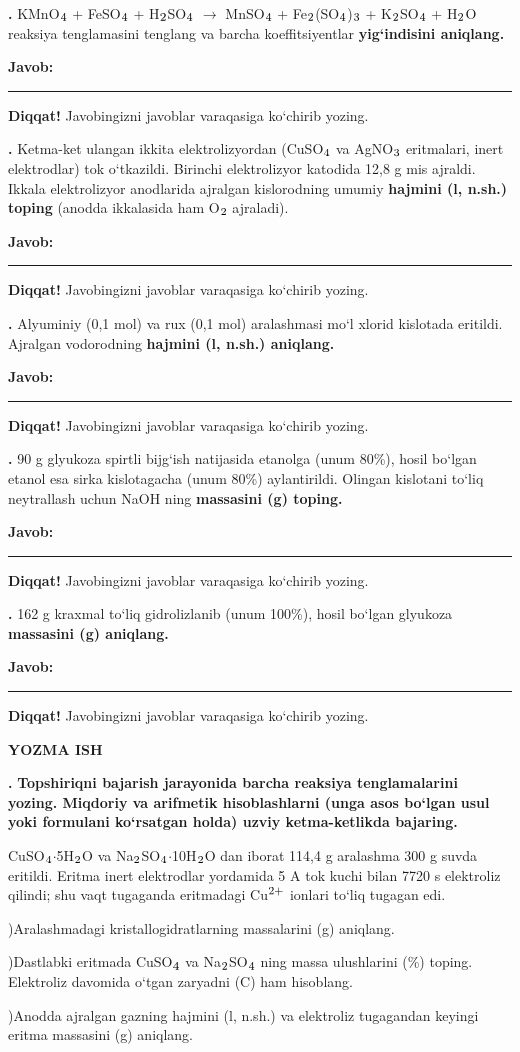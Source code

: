 \documentclass[11pt,a4paper]{article}
\renewcommand{\textsubscript}[1]{\ensuremath{_{\text{\fontsize{8}{8}\selectfont #1}}}}
\renewcommand{\textsuperscript}[1]{\ensuremath{^{\text{\fontsize{8}{8}\selectfont #1}}}}
\newcommand{\qn}[1]{\textbf{\fontsize{11.5}{13}\selectfont #1}}
\newcommand{\qsep}{\par\vspace{1pt}\noindent\rule{0pt}{0.4pt}\par\vspace{5pt}}
\newcommand{\javob}{\par\smallskip\noindent\textbf{Javob:} \rule[-2pt]{7.5cm}{0.4pt}\par\smallskip\noindent\textbf{Diqqat!} Javobingizni javoblar varaqasiga ko`chirib yozing.\par\medskip}
\begin{document}
\noindent\qn{36.} KMnO\textsubscript{4} + FeSO\textsubscript{4} + H\textsubscript{2}SO\textsubscript{4} $\to$ MnSO\textsubscript{4} + Fe\textsubscript{2}(SO\textsubscript{4})\textsubscript{3} + K\textsubscript{2}SO\textsubscript{4} + H\textsubscript{2}O reaksiya tenglamasini tenglang va barcha koeffitsiyentlar \textbf{yig`indisini aniqlang.}
\javob\qsep
\noindent\qn{37.} Ketma-ket ulangan ikkita elektrolizyordan (CuSO\textsubscript{4} va AgNO\textsubscript{3} eritmalari, inert elektrodlar) tok o`tkazildi. Birinchi elektrolizyor katodida 12,8 g mis ajraldi. Ikkala elektrolizyor anodlarida ajralgan kislorodning umumiy \textbf{hajmini (l, n.sh.) toping} (anodda ikkalasida ham O\textsubscript{2} ajraladi).
\javob\qsep
\noindent\qn{38.} Alyuminiy (0,1 mol) va rux (0,1 mol) aralashmasi mo`l xlorid kislotada eritildi. Ajralgan vodorodning \textbf{hajmini (l, n.sh.) aniqlang.}
\javob\qsep
\noindent\qn{39.} 90 g glyukoza spirtli bijg`ish natijasida etanolga (unum 80\%), hosil bo`lgan etanol esa sirka kislotagacha (unum 80\%) aylantirildi. Olingan kislotani to`liq neytrallash uchun NaOH ning \textbf{massasini (g) toping.}
\javob\qsep
\noindent\qn{40.} 162 g kraxmal to`liq gidrolizlanib (unum 100\%), hosil bo`lgan glyukoza \textbf{massasini (g) aniqlang.}
\javob\qsep
\par\bigskip\begin{center}\textbf{\fontsize{13}{15}\selectfont YOZMA ISH}\end{center}
\noindent\qn{41.} \textbf{Topshiriqni bajarish jarayonida barcha reaksiya tenglamalarini yozing. Miqdoriy va arifmetik hisoblashlarni (unga asos bo`lgan usul yoki formulani ko`rsatgan holda) uzviy ketma-ketlikda bajaring.}\par\smallskip
CuSO\textsubscript{4}$\cdot$5H\textsubscript{2}O va Na\textsubscript{2}SO\textsubscript{4}$\cdot$10H\textsubscript{2}O dan iborat 114,4 g aralashma 300 g suvda eritildi. Eritma inert elektrodlar yordamida 5 A tok kuchi bilan 7720 s elektroliz qilindi; shu vaqt tugaganda eritmadagi Cu\textsuperscript{2+} ionlari to`liq tugagan edi.\par
{})Aralashmadagi kristallogidratlarning massalarini (g) aniqlang.\par
{})Dastlabki eritmada CuSO\textsubscript{4} va Na\textsubscript{2}SO\textsubscript{4} ning massa ulushlarini (\%) toping. Elektroliz davomida o`tgan zaryadni (C) ham hisoblang.\par
{})Anodda ajralgan gazning hajmini (l, n.sh.) va elektroliz tugagandan keyingi eritma massasini (g) aniqlang.\par
\end{document}
